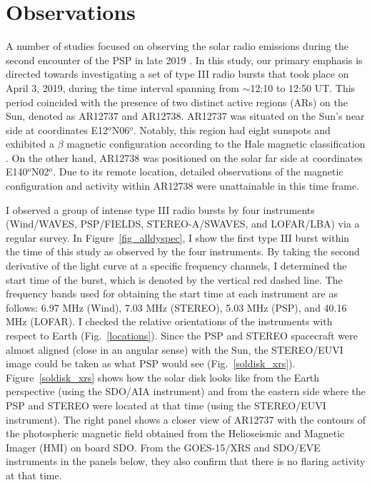 \section{Observations}
\label{sec_ch3_obs}
A number of studies focused on observing the solar radio emissions during the second encounter of the PSP in late 2019 \cite{krupar_2020, pulupa_2020, cattell_2021, harra_2021, badman_2022}. In this study, our primary emphasis is directed towards investigating a set of type III radio bursts that took place on April 3, 2019, during the time interval spanning from $\sim$12:10 to 12:50 UT. This period coincided with the presence of two distinct active regions (ARs) on the Sun, denoted as AR12737 and AR12738. 
AR12737 was situated on the Sun's near side at coordinates E12$^o$N06$^o$. Notably, this region had eight sunspots and exhibited a $\beta$ magnetic configuration according to the Hale magnetic classification \cite{hale_2019}. On the other hand, AR12738 was positioned on the solar far side at coordinates E140$^o$N02$^o$. Due to its remote location, detailed observations of the magnetic configuration and activity within AR12738 were unattainable in this time frame.

I observed a group of intense type III radio bursts by four instruments (Wind/WAVES, PSP/FIELDS, STEREO-A/SWAVES, and LOFAR/LBA) via a regular survey. In Figure~\ref{fig_alldyspec}, I show the first type III burst within the time of this study as observed by the four instruments. By taking the second derivative of the light curve at a specific frequency channels, I determined the start time of the burst, which is denoted by the vertical red dashed line. The frequency bands used for obtaining the start time at each instrument are as follows: 6.97 MHz (Wind), 7.03 MHz (STEREO), 5.03 MHz (PSP), and 40.16 MHz (LOFAR).
I checked the relative orientations of the instruments with respect to Earth (Fig.~\ref{locations}). Since the PSP and STEREO spacecraft were almost aligned (close in an angular sense) with the Sun, the STEREO/EUVI image could be taken as what PSP would see (Fig.~\ref{soldisk_xrs}).
Figure~\ref{soldisk_xrs} shows how the solar disk looks like from the Earth perspective (using the SDO/AIA instrument) and from the eastern side where the PSP and STEREO were located at that time (using the STEREO/EUVI instrument).
The right panel shows a closer view of AR12737 with the contours of the photospheric magnetic field obtained from the Helioseismic and Magnetic Imager (HMI) on board SDO.
From the GOES-15/XRS and SDO/EVE instruments in the panels below, they also confirm that there is no flaring activity at that time.

